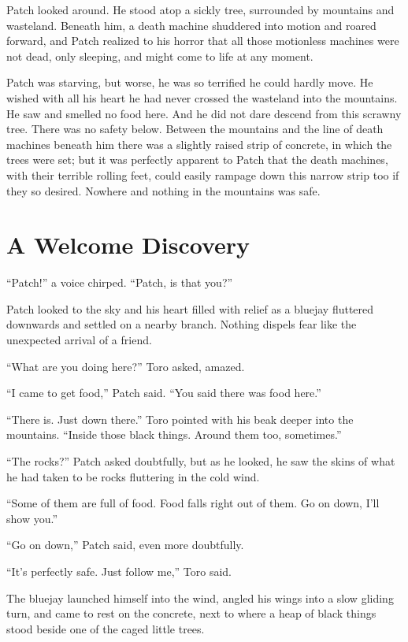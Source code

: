 \documentclass[12pt]{memoir}
\begin{document}
Patch looked around. He stood atop a sickly tree, surrounded by
mountains and wasteland. Beneath him, a death machine shuddered into
motion and roared forward, and Patch realized to his horror that all
those motionless machines were not dead, only sleeping, and might come
to life at any moment.

Patch was starving, but worse, he was so terrified he could hardly
move. He wished with all his heart he had never crossed the wasteland
into the mountains. He saw and smelled no food here. And he did not
dare descend from this scrawny tree. There was no safety
below. Between the mountains and the line of death machines beneath
him there was a slightly raised strip of concrete, in which the trees
were set; but it was perfectly apparent to Patch that the death
machines, with their terrible rolling feet, could easily rampage down
this narrow strip too if they so desired. Nowhere and nothing in the
mountains was safe.


\section{A Welcome Discovery}

“Patch!” a voice chirped. “Patch, is that you?”

Patch looked to the sky and his heart filled with relief as a bluejay
fluttered downwards and settled on a nearby branch. Nothing dispels
fear like the unexpected arrival of a friend.

“What are you doing here?” Toro asked, amazed.

“I came to get food,” Patch said. “You said there was food here.”

“There is. Just down there.” Toro pointed with his beak deeper into
the mountains. “Inside those black things. Around them too,
sometimes.”

“The rocks?” Patch asked doubtfully, but as he looked, he saw the
skins of what he had taken to be rocks fluttering in the cold wind.

“Some of them are full of food. Food falls right out of them. Go on
down, I’ll show you.”

“Go on down,” Patch said, even more doubtfully.

“It’s perfectly safe. Just follow me,” Toro said.

The bluejay launched himself into the wind, angled his wings into a
slow gliding turn, and came to rest on the concrete, next to where a
heap of black things stood beside one of the caged little trees.
\end{document}

